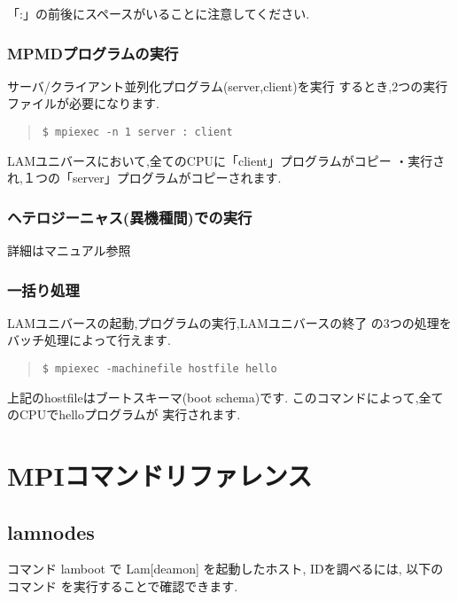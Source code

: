 \documentclass[a4paper,titlepage]{jreport}
\begin{document}
「:」の前後にスペースがいることに注意してください.

\subsubsection{\textbf{MPMDプログラムの実行}}

サーバ/クライアント並列化プログラム(server,client)を実行
するとき,2つの実行ファイルが必要になります.

\begin{quote}
\begin{screen}
\begin{verbatim}
$ mpiexec -n 1 server : client
\end{verbatim}
\end{screen}
\end{quote}

LAMユニバースにおいて,全てのCPUに「client」プログラムがコピー
・実行され,１つの「server」プログラムがコピーされます.

\subsubsection{\textbf{ヘテロジーニャス(異機種間)での実行}}
詳細はマニュアル参照

\subsubsection{\textbf{一括り処理}}
LAMユニバースの起動,プログラムの実行,LAMユニバースの終了
の3つの処理をバッチ処理によって行えます.

\begin{quote}
\begin{screen}
\begin{verbatim}
$ mpiexec -machinefile hostfile hello
\end{verbatim}
\end{screen}
\end{quote}

上記のhostfileはブートスキーマ(boot schema)です.
このコマンドによって,全てのCPUでhelloプログラムが
実行されます.

\newpage

\section{MPIコマンドリファレンス}

\subsection{lamnodes}
コマンド lamboot で Lam[deamon] を起動したホスト, IDを調べるには, 以下のコマンド
を実行することで確認できます.
\end{document}
